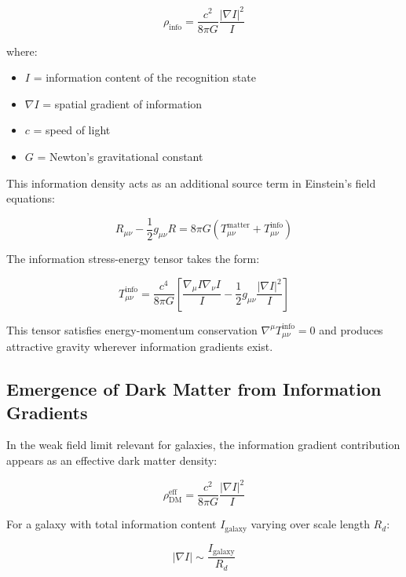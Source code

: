 \documentclass[12pt,letterpaper]{article}
\begin{document}
\begin{equation}
\rho_{\text{info}} = \frac{c^2}{8\pi G} \frac{|\nabla I|^2}{I}
\label{eq:rho_info}
\end{equation}

where:
\begin{itemize}
\item $I$ = information content of the recognition state
\item $\nabla I$ = spatial gradient of information
\item $c$ = speed of light
\item $G$ = Newton's gravitational constant
\end{itemize}

This information density acts as an additional source term in Einstein's field equations:

\begin{equation}
R_{\mu\nu} - \frac{1}{2}g_{\mu\nu}R = 8\pi G(T_{\mu\nu}^{\text{matter}} + T_{\mu\nu}^{\text{info}})
\label{eq:einstein_modified}
\end{equation}

The information stress-energy tensor takes the form:

\begin{equation}
T_{\mu\nu}^{\text{info}} = \frac{c^4}{8\pi G} \left[\frac{\nabla_\mu I \nabla_\nu I}{I} - \frac{1}{2}g_{\mu\nu}\frac{|\nabla I|^2}{I}\right]
\label{eq:T_info}
\end{equation}

This tensor satisfies energy-momentum conservation $\nabla^\mu T_{\mu\nu}^{\text{info}} = 0$ and produces attractive gravity wherever information gradients exist.

\subsection{Emergence of Dark Matter from Information Gradients}

In the weak field limit relevant for galaxies, the information gradient contribution appears as an effective dark matter density:

\begin{equation}
\rho_{\text{DM}}^{\text{eff}} = \frac{c^2}{8\pi G} \frac{|\nabla I|^2}{I}
\label{eq:rho_DM}
\end{equation}

For a galaxy with total information content $I_{\text{galaxy}}$ varying over scale length $R_d$:

\begin{equation}
|\nabla I| \sim \frac{I_{\text{galaxy}}}{R_d}
\label{eq:grad_scale}
\end{equation}
\end{document}

